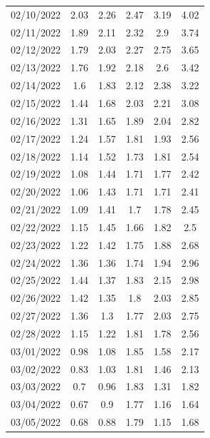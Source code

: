 \documentclass[withoutpreface,bwprint]{cumcmthesis} %
\begin{document}
\begin{appendices}
\begin{center}
\begin{longtable}{c|ccccc}
02/10/2022 & 2.03  & 2.26     & 2.47      & 3.19   & 4.02          \\
02/11/2022 & 1.89  & 2.11     & 2.32      & 2.9    & 3.74          \\
02/12/2022 & 1.79  & 2.03     & 2.27      & 2.75   & 3.65          \\
02/13/2022 & 1.76  & 1.92     & 2.18      & 2.6    & 3.42          \\
02/14/2022 & 1.6   & 1.83     & 2.12      & 2.38   & 3.22          \\
02/15/2022 & 1.44  & 1.68     & 2.03      & 2.21   & 3.08          \\
02/16/2022 & 1.31  & 1.65     & 1.89      & 2.04   & 2.82          \\
02/17/2022 & 1.24  & 1.57     & 1.81      & 1.93   & 2.56          \\
02/18/2022 & 1.14  & 1.52     & 1.73      & 1.81   & 2.54          \\
02/19/2022 & 1.08  & 1.44     & 1.71      & 1.77   & 2.42          \\
02/20/2022 & 1.06  & 1.43     & 1.71      & 1.71   & 2.41          \\
02/21/2022 & 1.09  & 1.41     & 1.7       & 1.78   & 2.45          \\
02/22/2022 & 1.15  & 1.45     & 1.66      & 1.82   & 2.5           \\
02/23/2022 & 1.22  & 1.42     & 1.75      & 1.88   & 2.68          \\
02/24/2022 & 1.36  & 1.36     & 1.74      & 1.94   & 2.96          \\
02/25/2022 & 1.44  & 1.37     & 1.83      & 2.15   & 2.98          \\
02/26/2022 & 1.42  & 1.35     & 1.8       & 2.03   & 2.85          \\
02/27/2022 & 1.36  & 1.3      & 1.77      & 2.03   & 2.75          \\
02/28/2022 & 1.15  & 1.22     & 1.81      & 1.78   & 2.56          \\
03/01/2022 & 0.98  & 1.08     & 1.85      & 1.58   & 2.17          \\
03/02/2022 & 0.83  & 1.03     & 1.81      & 1.46   & 2.13          \\
03/03/2022 & 0.7   & 0.96     & 1.83      & 1.31   & 1.82          \\
03/04/2022 & 0.67  & 0.9      & 1.77      & 1.16   & 1.64          \\
03/05/2022 & 0.68  & 0.88     & 1.79      & 1.15   & 1.68          \\

\end{longtable}
\end{center}
\end{appendices}
\end{document}
